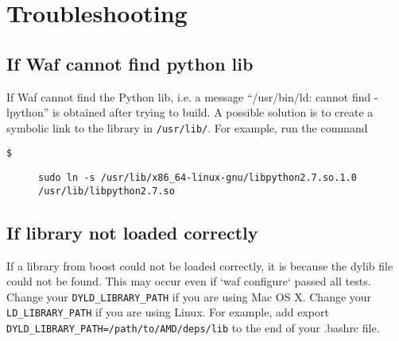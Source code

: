 \section{Troubleshooting \label{sec:Troubleshooting}}


\subsection{If Waf cannot find python lib}

If Waf cannot find the Python lib, i.e. a message ``/usr/bin/ld:
cannot find -lpython'' is obtained after trying to build. A possible
solution is to create a symbolic link to the library in \texttt{/usr/lib/}.
For example, run the command
\begin{description}
\item [{\texttt{\$}}] \texttt{sudo ln -s /usr/lib/x86\_64-linux-gnu/libpython2.7.so.1.0
/usr/lib/libpython2.7.so }\end{description}

\subsection{If library not loaded correctly}

If a library from boost could not be loaded correctly, it is because the dylib 
file could not be found.
%
This may occur even if  `waf configure` passed all tests. 
%
Change your \texttt{DYLD\_LIBRARY\_PATH} if you are using Mac OS X. 
%
Change your \texttt{LD\_LIBRARY\_PATH} if you are using Linux.
%
For example, add export \texttt{DYLD\_LIBRARY\_PATH=/path/to/AMD/deps/lib} to 
the end of your .bashrc file.